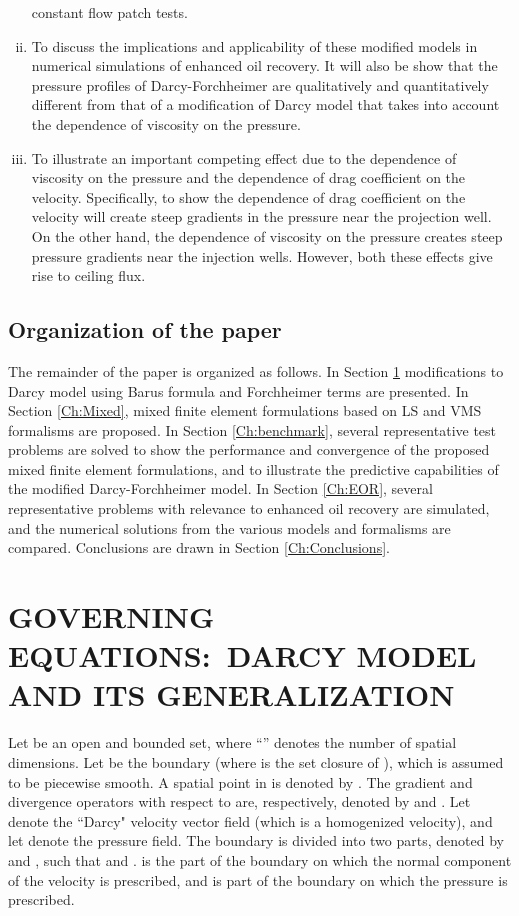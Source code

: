 \documentclass[11pt,reqno]{amsart}
\begin{document}
\begin{enumerate}[(i)]
  constant flow patch tests.
\item To discuss the implications and applicability of 
  these modified models in numerical simulations of 
  enhanced oil recovery. It will also be show that 
  the pressure profiles of Darcy-Forchheimer are 
  qualitatively and quantitatively different from 
  that of a modification of Darcy model that takes 
  into account the dependence of viscosity on the 
  pressure. 
\item To illustrate an important competing effect 
  due to the dependence of viscosity on the pressure 
  and the dependence of drag coefficient on the 
  velocity. Specifically, to show the dependence 
  of drag coefficient on the velocity will create 
  steep gradients in the pressure near the projection 
  well. On the other hand, the dependence of viscosity 
  on the pressure creates steep pressure gradients 
  near the injection wells. However, both these 
  effects give rise to ceiling flux. 
\end{enumerate}

\subsection{Organization of the paper}
The remainder of the paper is organized as follows. 
In Section \ref{Ch:Governing} modifications to Darcy 
model using Barus formula and Forchheimer terms are 
presented. In Section \ref{Ch:Mixed}, mixed finite 
element formulations based on LS and VMS formalisms 
are proposed.
In Section \ref{Ch:benchmark}, several representative 
test problems are solved to show the performance and 
convergence of the proposed mixed finite element 
formulations, and  to illustrate the predictive 
capabilities of the modified Darcy-Forchheimer 
model. In Section \ref{Ch:EOR}, several representative 
problems with relevance to enhanced oil recovery 
are simulated, and the numerical solutions from 
the various models and formalisms are compared. 
Conclusions are drawn in Section \ref{Ch:Conclusions}.
 
\section{GOVERNING EQUATIONS:~DARCY MODEL AND ITS GENERALIZATION}
\label{Ch:Governing}

Let  be an open and bounded 
set, where ``'' denotes the number of spatial dimensions. 
Let  be the 
boundary (where  is the set closure of 
), which is assumed to be piecewise smooth. A spatial 
point in  is denoted by . 
The gradient and divergence operators with respect to 
 are, respectively, denoted by  and . Let  denote the ``Darcy" velocity 
vector field (which is a homogenized velocity), and let 
 denote the pressure 
field. 
The boundary is divided into two parts, denoted by  
and , such that  
and .  
is the part of the boundary on which the normal component of the 
velocity is prescribed, and  is part of the boundary 
on which the pressure is prescribed. 
\end{document}
